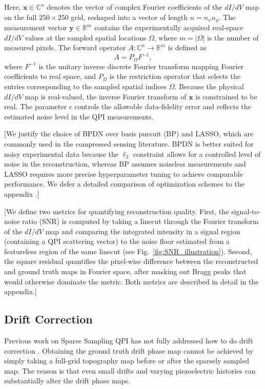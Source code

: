 \documentclass[amsmath,amssymb,superscriptaddress,longbibliography,prb,twocolumn,floatfix]{revtex4-2}
\newif\ifptitle
\newif\ifpnumber
\newcounter{para}
\newcommand\ptitle[1]{\par\refstepcounter{para}
{\ifpnumber{\noindent\textcolor{lightgray}{\textbf{\thepara}}\indent}\fi}
{\ifptitle{\textbf{[{#1}]}}\fi}}
\begin{document}
\noindent Here, \(\mathbf{x} \in \mathbb{C}^n\) denotes the vector of complex Fourier coefficients of the $dI/dV$ map on the full \(250 \times 250\) grid, reshaped into a vector of length \(n = n_x n_y\). The measurement vector \(\mathbf{y} \in \mathbb{R}^m\) contains the experimentally acquired real-space $dI/dV$ values at the sampled spatial locations \(\Omega\), where \(m = |\Omega|\) is the number of measured pixels. The forward operator \(A : \mathbb{C}^n \to \mathbb{R}^m\) is defined as
\[
A = P_\Omega F^{-1},
\]
where \(F^{-1}\) is the unitary inverse discrete Fourier transform mapping Fourier coefficients to real space, and \(P_\Omega\) is the restriction operator that selects the entries corresponding to the sampled spatial indices \(\Omega\). Because the physical $dI/dV$ map is real-valued, the inverse Fourier transform of \(\mathbf{x}\) is constrained to be real. The parameter \(\epsilon\) controls the allowable data-fidelity error and reflects the estimated noise level in the QPI measurements.

\ptitle{Briefly Discuss Optimization Scheme}
[We justify the choice of BPDN over basis pursuit (BP) and LASSO, which are commonly used in the compressed sensing literature. BPDN is better suited for noisy experimental data because the \(\ell_2\) constraint allows for a controlled level of noise in the reconstruction, whereas BP assumes noiseless measurements and LASSO requires more precise hyperparameter tuning to achieve comparable performance. We defer a detailed comparison of optimization schemes to the appendix \cite{OppligerMethodsX2022}.]

\ptitle{How we determine reconstruction quality}
[We define two metrics for quantifying reconstruction quality. First, the signal-to-noise ratio (SNR) is computed by taking a linecut through the Fourier transform of the $dI/dV$ map and comparing the integrated intensity in a signal region (containing a QPI scattering vector) to the noise floor estimated from a featureless region of the same linecut (see Fig.~\ref{fig:SNR_illustration}). Second, the square residual quantifies the pixel-wise difference between the reconstructed and ground truth maps in Fourier space, after masking out Bragg peaks that would otherwise dominate the metric. Both metrics are described in detail in the appendix.]

\subsection{Drift Correction}
\ptitle{Introduction to the difficulty of drift correcting reconstructed maps}
Previous work on Sparse Sampling QPI has not fully addressed how to do drift correction \cite{OppligerPRR2020, NakanishiOhnoJPSJ2016}. Obtaining the ground truth drift phase map cannot be achieved by simply taking a full-grid topography map before or after the sparsely sampled map. The reason is that even small drifts and varying piezoelectric histories can substantially alter the drift phase maps.
\end{document}
